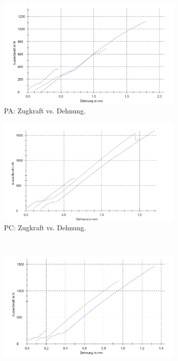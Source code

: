\documentclass[a4paper,12pt]{article}
\begin{document}
\begin{figure}[H]
\centering
\begin{subfigure}{0.45\textwidth}
    \includegraphics[width=\textwidth]{images/PA.png}
    \caption{PA: Zugkraft vs. Dehnung.}
\end{subfigure}
\hfill
\begin{subfigure}{0.45\textwidth}
    \includegraphics[width=\textwidth]{images/PC.png}
    \caption{PC: Zugkraft vs. Dehnung.}
\end{subfigure}
\\
\begin{subfigure}{0.45\textwidth}
    \includegraphics[width=\textwidth]{images/PMMA.png}

\end{subfigure}
\end{figure}
\end{document}

